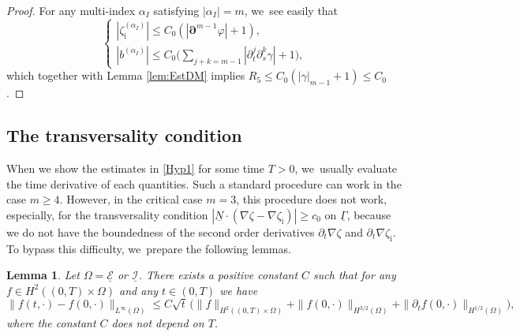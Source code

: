 \documentclass[10pt]{amsart}
\newcommand{\dt}{\partial_t}
\newcommand{\cI}{{\mathcal I}}
\newcommand{\cE}{{\mathcal E}}
\newcommand{\ul}[1]{\underline{#1}}
\newcommand{\itGamma}{\mathit{\Gamma}}
\newtheorem{lemma}[theorem]{Lemma}
\theoremstyle{definition}
\begin{document}
\begin{proof}
For any multi-index $\alpha_I$ satisfying $|\alpha_I|=m$, we~see easily that
\[
\begin{cases}
|\zeta_\mathrm{i}^{(\alpha_I)}| \leq C_0(|\bm{\partial}^{m-1}\varphi|+1), \\
|b^{(\alpha_I)}| \leq C_0 \bigl(\sum_{j+k=m-1}|\dt^j\partial_s^k\gamma| +1\bigr),
\end{cases}
\]
which together with Lemma \ref{lem:EstDM} implies $R_5 \leq C_0(|\gamma|_{m-1}+1)\leq C_0$.
\end{proof}

\subsection{The transversality condition}\label{secttransv}
When we show the estimates in \eqref{Hyp1} for some time $T>0$, we~usually evaluate the time derivative of each quantities.
Such a standard procedure can work in the case $m\geq4$.
However, in the critical case $m=3$, this procedure does not work, especially, for the transversality condition
\hbox{$|\ul{N}\cdot(\nabla\zeta-\nabla\zeta_\mathrm{i})| \geq c_0$} on $\ul{\itGamma}$,
because we do not have the boundedness of the second order derivatives $\dt\nabla\zeta$ and $\dt\nabla\zeta_\mathrm{i}$.
To bypass this difficulty, we~prepare the following lemmas.

\begin{lemma}\label{lem:Embedding1}
Let $\Omega=\ul{\cE}$ or $\ul{\cI}$.
There exists a positive constant $C$ such that for any $f\in H^2((0,T)\times\Omega)$
and any $t\in(0,T)$ we have
\[
\|f(t,\cdot)-f(0,\cdot)\|_{L^\infty(\Omega)}
\leq C\sqrt{t}\,\bigl(\|f\|_{H^2((0,T)\times\Omega)} + \|f(0,\cdot)\|_{H^{3/2}(\Omega)} + \|\dt f(0,\cdot)\|_{H^{1/2}(\Omega)} \bigr),
\]
where the constant $C$ does not depend on $T$.
\end{lemma}
\end{document}
